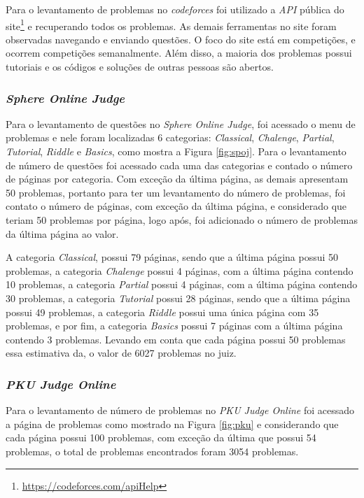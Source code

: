 Para o levantamento de problemas no \textit{codeforces} foi utilizado a \textit{API} pública do site\footnote{\url{https://codeforces.com/apiHelp}} e recuperando todos os problemas. As demais ferramentas no site foram observadas navegando e enviando questões.  O foco do site está em competições, e ocorrem competições semanalmente. Além disso, a maioria dos problemas possui tutoriais e os códigos e soluções de outras pessoas são abertos.


\subsubsection{\textit{Sphere Online Judge}}
\label{subsubsec:met_spot}

Para o levantamento de questões no \textit{Sphere Online Judge}, foi acessado  o menu de problemas e nele foram localizadas 6 categorias: \textit{Classical}, \textit{Chalenge}, \textit{Partial}, \textit{Tutorial}, \textit{Riddle} e \textit{Basics}, como mostra a Figura \ref{fig:spoj}. Para o levantamento de número de questões foi acessado cada uma das categorias e contado o número de páginas por categoria. Com exceção da última página, as demais apresentam 50 problemas, portanto para ter um levantamento do número de problemas, foi contato o número de páginas, com exceção da última página, e considerado que teriam 50 problemas por página, logo após, foi adicionado o número de problemas da última página ao valor. 

A categoria \textit{Classical}, possui 79 páginas, sendo que a última página possui 50 problemas, a categoria \textit{Chalenge} possui 4 páginas, com a última página contendo 10 problemas, a categoria \textit{Partial} possui 4 páginas, com a última página contendo 30 problemas, a categoria \textit{Tutorial} possui 28 páginas, sendo que a última página possui 49 problemas, a categoria \textit{Riddle} possui uma única página com 35 problemas, e por fim, a categoria \textit{Basics} possui 7 páginas com a última página contendo 3 problemas. Levando em conta que cada página possui 50 problemas essa estimativa da, o valor de 6027 problemas no juiz.  


\subsubsection{\textit{PKU Judge Online}}
\label{subsubsec:met_pku}

Para o levantamento de número de problemas no \textit{PKU Judge Online} foi acessado a página de problemas como mostrado na Figura \ref{fig:pku} e considerando que cada página possui 100 problemas, com exceção da última que possui 54 problemas, o total de problemas encontrados foram 3054 problemas.

